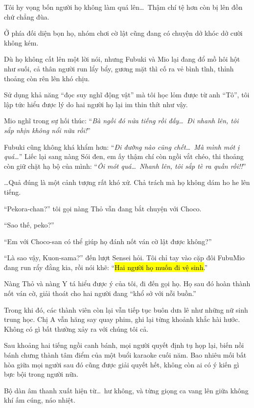 \documentclass[../main.tex]{subfiles}
\begin{document}
Tôi hy vọng bốn người họ không làm quá lên\dots\ Thậm chí tệ hơn còn bị lên đồn chứ chẳng đùa.

Ở phía đối diện bọn họ, nhóm chơi cờ lật cũng đang có chuyện dở khóc dở cười không kém.

Dù họ không cất lên một lời nói, nhưng Fubuki và Mio lại đang đổ mồ hôi hột như suối, cả thân người run lẩy bẩy, gương mặt thì cố ra vẻ bình tĩnh, thỉnh thoảng còn rên lên khó chịu.

Sử dụng khả năng ``đọc suy nghĩ động vật'' mà tôi học lỏm được từ anh ``Tô'', tôi lập tức hiểu được lý do hai người họ lại im thin thít như vậy.

Mio nghĩ trong sự hối thúc: ``\textit{Bà ngồi đó nửa tiếng rồi đấy\dots\ Đi nhanh lên, tôi sắp nhịn không nổi nữa rồi!}''

Fubuki cũng không khá khẩm hơn: ``\textit{Đi đường nào cũng chết\dots\ Mà mình mót ị quá\dots}'' Liếc lại sang nàng Sói đen, em ấy thậm chí còn ngồi vắt chéo, thi thoảng còn giữ chặt hạ bộ của mình: ``\textit{Ôi mót quá\dots\ Nhanh lên, tôi sắp tè ra quần rồi!!}''

\dots Quả đúng là một cảnh tượng rất khó xử. Chả trách mà họ không dám ho he lên tiếng.

``Pekora-chan?'' tôi gọi nàng Thỏ vẫn đang bắt chuyện với Choco.

``Sao thế, peko?''

``Em với Choco-san có thể giúp họ đánh nốt ván cờ lật được không?''

``Là sao vậy, Kuon-sama?'' đến lượt Sensei hỏi. Tôi chỉ tay vào cặp đôi FubuMio đang run rẩy đằng kia, rồi nói khẽ: ``\hl{Hai người họ muốn đi vệ sinh.}''

Nàng Thỏ và nàng Y tá hiểu được ý của tôi, đi đến gọi họ. Họ sau đó hoàn thành nốt ván cờ, giải thoát cho hai người đang ``khổ sở với nỗi buồn.''

Trong khi đó, các thành viên còn lại vẫn tiếp tục buôn dưa lê như những nữ sinh trung học. Chị A vẫn hăng say quay phim, ghi lại từng khoảnh khắc hài hước. Không có gì bất thường xảy ra với chúng tôi cả.

Sau khoảng hai tiếng ngồi canh bánh, mọi người quyết định tụ họp lại, biến nồi bánh chưng thành tâm điểm của một buổi karaoke cuối năm. Bao nhiêu mối bất hòa giữa mọi người sau đó cũng được giải quyết hết, không còn ai có ý kiến gì bực bội trong người nữa.

Bộ dàn âm thanh xuất hiện từ\dots\ hư không, và từng giọng ca vang lên giữa không khí ấm cúng, náo nhiệt.
\end{document}
